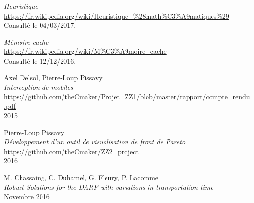 \renewcommand{\bibname}{Webographie}
\begin{thebibliography}{9}
    \emph{Heuristique}\\
    \url{https://fr.wikipedia.org/wiki/Heuristique_%28math%C3%A9matiques%29}\\
    Consulté le 04/03/2017.
  
    \emph{Mémoire cache}\\
    \url{https://fr.wikipedia.org/wiki/M%C3%A9moire_cache}\\
    Consulté le 12/12/2016.
    
    Axel Delsol, Pierre-Loup Pissavy\\
    \emph{Interception de mobiles}\\
    \url{https://github.com/theCmaker/Projet_ZZ1/blob/master/rapport/compte_rendu.pdf}\\
    2015

    Pierre-Loup Pissavy\\
    \emph{Développement d’un outil de visualisation de front de Pareto}
    \url{https://github.com/theCmaker/ZZ2_project}\\
    2016
    
    M. Chassaing, C. Duhamel, G. Fleury, P. Lacomme\\
    \emph{Robust Solutions for the DARP with variations in transportation time}\\
    Novembre 2016
\end{thebibliography}
